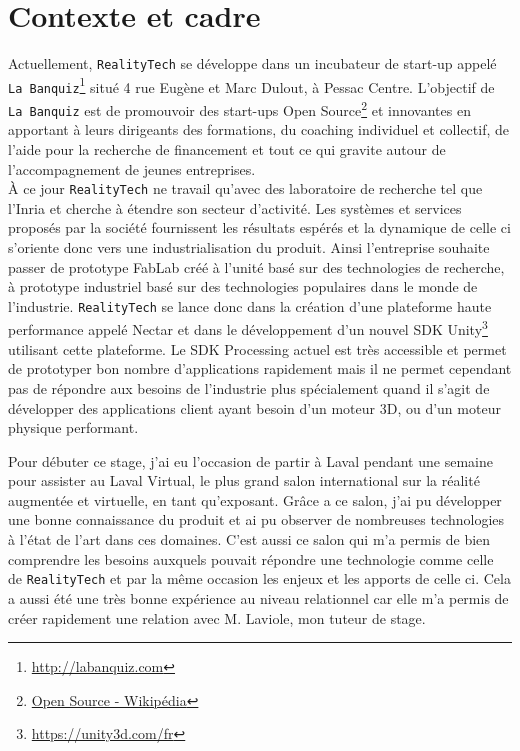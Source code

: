 \section{Contexte et cadre}
\label{sec:contexte}
Actuellement, \texttt{RealityTech} se développe dans un incubateur de start-up appelé \texttt{La Banquiz}\footnote{\href{http://labanquiz.com}{http://labanquiz.com}} situé 4 rue Eugène et Marc Dulout, à Pessac Centre. L'objectif de \texttt{La Banquiz} est de promouvoir des start-ups Open Source\footnote{\href{https://fr.wikipedia.org/wiki/Open\_source}{Open Source - Wikipédia}} et innovantes en apportant à leurs dirigeants des formations, du coaching individuel et collectif, de l'aide pour la recherche de financement et tout ce qui gravite autour de l'accompagnement de jeunes entreprises.\\

À ce jour \texttt{RealityTech} ne travail qu'avec des laboratoire de recherche tel que l'Inria et cherche à étendre son secteur d'activité. Les systèmes et services proposés par la société fournissent les résultats espérés et la dynamique de celle ci s'oriente donc vers une industrialisation du produit. Ainsi l'entreprise souhaite passer de prototype FabLab créé à l'unité basé sur des technologies de recherche, à prototype industriel basé sur des technologies populaires dans le monde de l'industrie. \texttt{RealityTech} se lance donc dans la création d'une plateforme haute performance appelé Nectar et dans le développement d'un nouvel SDK Unity\footnote{\href{https://unity3d.com/fr}{https://unity3d.com/fr}} utilisant cette plateforme. Le SDK Processing actuel est très accessible et permet de prototyper bon nombre d'applications rapidement mais il ne permet cependant pas de répondre aux besoins de l'industrie plus spécialement quand il s'agit de développer des applications client ayant besoin d'un moteur 3D, ou d'un moteur physique performant.

Pour débuter ce stage, j'ai eu l'occasion de partir à Laval pendant une semaine pour assister au Laval Virtual, le plus grand salon international sur la réalité augmentée et virtuelle, en tant qu'exposant. Grâce a ce salon, j'ai pu développer une bonne connaissance du produit et ai pu observer de nombreuses technologies à l'état de l'art dans ces domaines. C'est aussi ce salon qui m'a permis de bien comprendre les besoins auxquels pouvait répondre une technologie comme celle de \texttt{RealityTech} et par la même occasion les enjeux et les apports de celle ci. Cela a aussi été une très bonne expérience au niveau relationnel car elle m'a permis de créer rapidement une relation avec M. Laviole, mon tuteur de stage.

